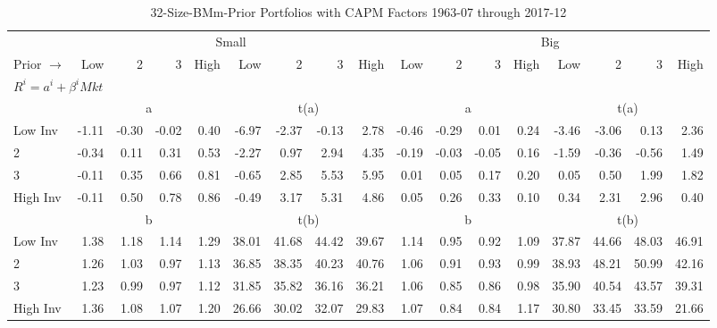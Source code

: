 
\begin{table}[!ht]
\footnotesize
\centering
\caption{32-Size-BMm-Prior Portfolios with CAPM Factors 1963-07 through 2017-12}
\begin{tabular}{lrrrrrrrrrrrrrrrr}
  \toprule
    & \multicolumn{8}{c}{Small} & \multicolumn{8}{c}{Big} \\
      \cmidrule(r){2-9} \cmidrule(r){10-17}
    Prior $\rightarrow$ & Low & 2 & 3 & High & Low & 2 & 3 & High & Low & 2 & 3 & High & Low & 2 & 3 & High \\ 
  \midrule
  \multicolumn{17}{l}{$R^i=a^i+\beta^iMkt$} \\

  
    
      & \multicolumn{4}{c}{a} & \multicolumn{4}{c}{t(a)}
    
      & \multicolumn{4}{c}{a} & \multicolumn{4}{c}{t(a)}
    
    \\
      \cmidrule(r){2-5} \cmidrule(r){6-9} \cmidrule(r){10-13} \cmidrule(r){14-17}

    Low Inv   & -1.11  & -0.30  & -0.02  & 0.40  & -6.97  & -2.37  & -0.13  & 2.78  & -0.46  & -0.29  & 0.01  & 0.24  & -3.46  & -3.06  & 0.13  & 2.36  \\
           2  & -0.34  & 0.11  & 0.31  & 0.53  & -2.27  & 0.97  & 2.94  & 4.35  & -0.19  & -0.03  & -0.05  & 0.16  & -1.59  & -0.36  & -0.56  & 1.49  \\
           3  & -0.11  & 0.35  & 0.66  & 0.81  & -0.65  & 2.85  & 5.53  & 5.95  & 0.01  & 0.05  & 0.17  & 0.20  & 0.05  & 0.50  & 1.99  & 1.82  \\
    High Inv  & -0.11  & 0.50  & 0.78  & 0.86  & -0.49  & 3.17  & 5.31  & 4.86  & 0.05  & 0.26  & 0.33  & 0.10  & 0.34  & 2.31  & 2.96  & 0.40  \\

  
    
      & \multicolumn{4}{c}{b} & \multicolumn{4}{c}{t(b)}
    
      & \multicolumn{4}{c}{b} & \multicolumn{4}{c}{t(b)}
    
    \\
      \cmidrule(r){2-5} \cmidrule(r){6-9} \cmidrule(r){10-13} \cmidrule(r){14-17}

    Low Inv   & 1.38  & 1.18  & 1.14  & 1.29  & 38.01  & 41.68  & 44.42  & 39.67  & 1.14  & 0.95  & 0.92  & 1.09  & 37.87  & 44.66  & 48.03  & 46.91  \\
           2  & 1.26  & 1.03  & 0.97  & 1.13  & 36.85  & 38.35  & 40.23  & 40.76  & 1.06  & 0.91  & 0.93  & 0.99  & 38.93  & 48.21  & 50.99  & 42.16  \\
           3  & 1.23  & 0.99  & 0.97  & 1.12  & 31.85  & 35.82  & 36.16  & 36.21  & 1.06  & 0.85  & 0.86  & 0.98  & 35.90  & 40.54  & 43.57  & 39.31  \\
    High Inv  & 1.36  & 1.08  & 1.07  & 1.20  & 26.66  & 30.02  & 32.07  & 29.83  & 1.07  & 0.84  & 0.84  & 1.17  & 30.80  & 33.45  & 33.59  & 21.66  \\

  

  \bottomrule
\end{tabular}
\label{tbl:32_Size_BMm_Prior_CAPM}
\end{table}
